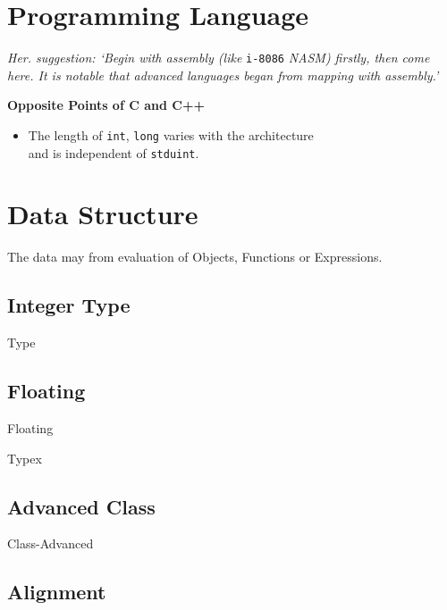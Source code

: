 


\section{Programming Language}

\textit{Her. suggestion: `Begin with assembly (like} \verb|i-8086| \textit{NASM) firstly, then come here. It is notable that advanced languages began from mapping with assembly.'}

\textbf{Opposite Points of C and C++}

\begin{itemize}

\item The length of \verb|int|, \verb|long| varies with the architecture\\		and is independent of \verb|stduint|.
\end{itemize}





\section{Data Structure}

The data may from evaluation of Objects, Functions or Expressions.



\subsection{Integer Type}

{Type}



\subsection{Floating}

{Floating}

{Typex}



\subsection{Advanced Class}

{Class-Advanced}



\subsection{Alignment}

